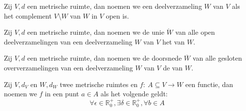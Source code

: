 \documentclass[main.tex]{subfiles}
\begin{document}
\begin{de}
  Zij $V,d$ een metrische ruimte, dan noemen we een deelverzameling $W$ van $V$  als het complement $V\setminus W$ van $W$ in $V$ open is.
\end{de}
 
\begin{de}
  Zij $V,d$ een metrische ruimte, dan noemen we de unie $\mathring{W}$ van alle open deelverzamelingen van een deelverzameling $W$ van $V$ het  van $W$.
\end{de}

\begin{de}
  Zij $V,d$ een metrische ruimte, dan noemen we de doorsnede $\overline{W}$ van alle gesloten oververzamelingen van een deelverzameling $W$ van $V$ de  van $W$.
\end{de}

\begin{de}
  Zij $V,d_{V}$ en $W,d_{W}$ twee metrische ruimtes en $f:\ A \subseteq V \rightarrow W$ een functie, dan noemen we $f$  in een punt $a\in A$ als het volgende geldt:
  \[ \forall \epsilon \in \mathbb{R}_{0}^{+}, \exists \delta \in \mathbb{R}_{0}^{+}, \forall b \in A\]
\end{de}
\end{document}
